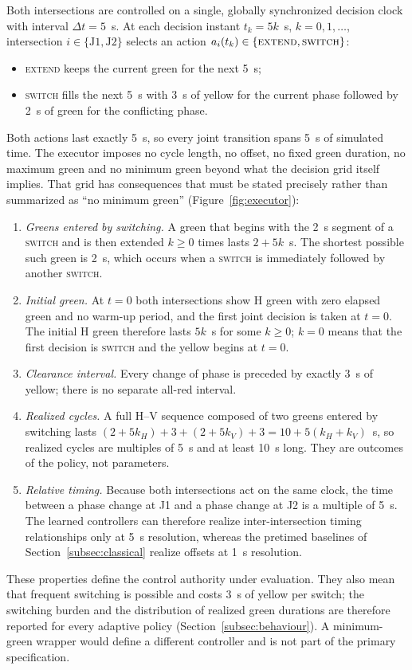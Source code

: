 \documentclass[review,12pt]{elsarticle}
\begin{document}
Both intersections are controlled on a single, globally synchronized
decision clock with interval $\Delta t=5$~s. At each decision instant
$t_k=5k$~s, $k=0,1,\dots$, intersection $i\in\{\mathrm{J1},\mathrm{J2}\}$
selects an action $a_i(t_k)\in\{\textsc{extend},\textsc{switch}\}$:
\begin{itemize}
\item \textsc{extend} keeps the current green for the next 5~s;
\item \textsc{switch} fills the next 5~s with 3~s of yellow for the
current phase followed by 2~s of green for the conflicting phase.
\end{itemize}
Both actions last exactly 5~s, so every joint transition spans 5~s of
simulated time. The executor imposes no cycle length, no offset, no
fixed green duration, no maximum green and no minimum green beyond what
the decision grid itself implies. That grid has consequences that must
be stated precisely rather than summarized as ``no minimum green''
(Figure~\ref{fig:executor}):
\begin{enumerate}[label=(\roman*)]
\item \emph{Greens entered by switching.} A green that begins with the
2~s segment of a \textsc{switch} and is then extended $k\geq 0$ times
lasts $2+5k$~s. The shortest possible such green is 2~s, which occurs
when a \textsc{switch} is immediately followed by another
\textsc{switch}.
\item \emph{Initial green.} At $t=0$ both intersections show H green
with zero elapsed green and no warm-up period, and the first joint
decision is taken at $t=0$. The initial H green therefore lasts $5k$~s
for some $k\geq 0$; $k=0$ means that the first decision is
\textsc{switch} and the yellow begins at $t=0$.
\item \emph{Clearance interval.} Every change of phase is preceded by
exactly 3~s of yellow; there is no separate all-red interval.
\item \emph{Realized cycles.} A full H--V sequence composed of two greens
entered by switching lasts $(2+5k_H)+3+(2+5k_V)+3=10+5(k_H+k_V)$~s, so
realized cycles are multiples of 5~s and at least 10~s long. They are
outcomes of the policy, not parameters.
\item \emph{Relative timing.} Because both intersections act on the same
clock, the time between a phase change at J1 and a phase change at J2 is
a multiple of 5~s. The learned controllers can therefore realize
inter-intersection timing relationships only at 5~s resolution, whereas
the pretimed baselines of Section~\ref{subsec:classical} realize offsets
at 1~s resolution.
\end{enumerate}
These properties define the control authority under evaluation. They
also mean that frequent switching is possible and costs 3~s of yellow
per switch; the switching burden and the distribution of realized green
durations are therefore reported for every adaptive policy
(Section~\ref{subsec:behaviour}). A minimum-green wrapper would define a
different controller and is not part of the primary specification.
\end{document}
